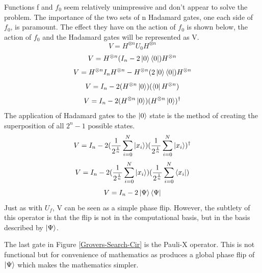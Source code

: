 \documentclass[authoryearcitations]{UoYCSproject}
\begin{document}
Functions f and $f_0$ seem relatively unimpressive and don't appear to solve the problem.
The importance of the two sets of n Hadamard gates, one each side of $f_0$, is paramount.
The effect they have on the action of $f_0$ is shown below, the action of $f_0$ and the Hadamard gates will be represented as V.
\begin{equation}
V=H^{\otimes{n}}U_0{H}^{\otimes{n}}
\end{equation}
\begin{equation}
V=H^{\otimes{n}}(I_n-2\left\vert{0}\right\rangle\left\langle{0}\right\vert){H}^{\otimes{n}}
\end{equation}
\begin{equation}
V=H^{\otimes{n}}I_n{H}^{\otimes{n}}-H^{\otimes{n}}(2\left\vert{0}\right\rangle\left\langle{0}\right\vert){H}^{\otimes{n}}
\end{equation}
\begin{equation}
V=I_n-2(H^{\otimes{n}}\left\vert{0}\right\rangle)(\left\langle{0}\right\vert{H}^{\otimes{n}})
\end{equation}
\begin{equation}
V=I_n-2(H^{\otimes{n}}\left\vert{0}\right\rangle)({H}^{\otimes{n}}\left\vert{0}\right\rangle)^\dagger
\end{equation}
The application of Hadamard gates to the $\left\vert{0}\right\rangle$ state is the method of creating the superposition of all $2^n-1$ possible states.
\begin{equation}
V=I_n-2(\frac{1}{2^{\frac{1}{n}}}\sum\limits_{i=0}^N \left\vert{x_i}\right\rangle)(\frac{1}{2^{\frac{1}{n}}}\sum\limits_{i=0}^N \left\vert{x_i}\right\rangle)^\dagger
\end{equation}
\begin{equation}
V=I_n-2(\frac{1}{2^{\frac{1}{n}}}\sum\limits_{i=0}^N \left\vert{x_i}\right\rangle)(\frac{1}{2^{\frac{1}{n}}}\sum\limits_{i=0}^N \left\langle{x_i}\right\vert)
\end{equation}
\begin{equation}
V=I_n-2\left\vert{\Psi}\right\rangle\left\langle{\Psi}\right\vert
\end{equation}
Just as with $U_f$, V can be seen as a simple phase flip.
However, the subtlety of this operator is that the flip is not in the computational basis, but in the basis described by $\left\vert{\Psi}\right\rangle$.

The last gate in Figure \ref{Grovers-Search-Cir} is the Pauli-X operator.
This is not functional but for convenience of mathematics as produces a global phase flip of $\left\vert{\Psi}\right\rangle$ which makes the mathematics simpler.
\end{document}
